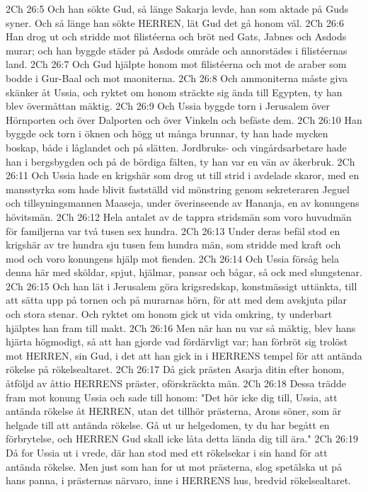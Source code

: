 2Ch 26:5  Och han sökte Gud, så länge Sakarja levde, han som aktade på Guds syner. Och så länge han sökte HERREN, lät Gud det gå honom väl.
2Ch 26:6  Han drog ut och stridde mot filistéerna och bröt ned Gats, Jabnes och Asdods murar; och han byggde städer på Asdods område och annorstädes i filistéernas land.
2Ch 26:7  Och Gud hjälpte honom mot filistéerna och mot de araber som bodde i Gur-Baal och mot maoniterna.
2Ch 26:8  Och ammoniterna måste giva skänker åt Ussia, och ryktet om honom sträckte sig ända till Egypten, ty han blev övermåttan mäktig.
2Ch 26:9  Och Ussia byggde torn i Jerusalem över Hörnporten och över Dalporten och över Vinkeln och befäste dem.
2Ch 26:10  Han byggde ock torn i öknen och högg ut många brunnar, ty han hade mycken boskap, både i låglandet och på slätten. Jordbruks- och vingårdsarbetare hade han i bergsbygden och på de bördiga fälten, ty han var en vän av åkerbruk.
2Ch 26:11  Och Ussia hade en krigshär som drog ut till strid i avdelade skaror, med en mansstyrka som hade blivit fastställd vid mönstring genom sekreteraren Jeguel och tillsyningsmannen Maaseja, under överinseende av Hananja, en av konungens hövitsmän.
2Ch 26:12  Hela antalet av de tappra stridsmän som voro huvudmän för familjerna var två tusen sex hundra.
2Ch 26:13  Under deras befäl stod en krigshär av tre hundra sju tusen fem hundra män, som stridde med kraft och mod och voro konungens hjälp mot fienden.
2Ch 26:14  Och Ussia försåg hela denna här med sköldar, spjut, hjälmar, pansar och bågar, så ock med slungstenar.
2Ch 26:15  Och han lät i Jerusalem göra krigsredskap, konstmässigt uttänkta, till att sätta upp på tornen och på murarnas hörn, för att med dem avskjuta pilar och stora stenar. Och ryktet om honom gick ut vida omkring, ty underbart hjälptes han fram till makt.
2Ch 26:16  Men när han nu var så mäktig, blev hans hjärta högmodigt, så att han gjorde vad fördärvligt var; han förbröt sig trolöst mot HERREN, sin Gud, i det att han gick in i HERRENS tempel för att antända rökelse på rökelsealtaret.
2Ch 26:17  Då gick prästen Asarja ditin efter honom, åtföljd av åttio HERRENS präster, oförskräckta män.
2Ch 26:18  Dessa trädde fram mot konung Ussia och sade till honom: "Det hör icke dig till, Ussia, att antända rökelse åt HERREN, utan det tillhör prästerna, Arons söner, som är helgade till att antända rökelse. Gå ut ur helgedomen, ty du har begått en förbrytelse, och HERREN Gud skall icke låta detta lända dig till ära."
2Ch 26:19  Då for Ussia ut i vrede, där han stod med ett rökelsekar i sin hand för att antända rökelse. Men just som han for ut mot prästerna, slog spetälska ut på hans panna, i prästernas närvaro, inne i HERRENS hus, bredvid rökelsealtaret.
